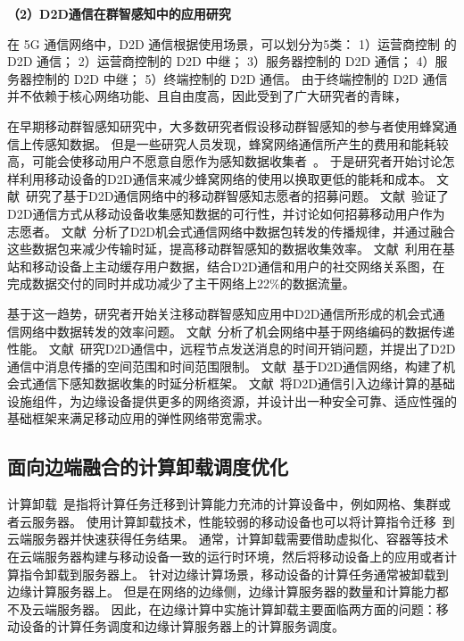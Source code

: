 \textbf{（2）D2D通信在群智感知中的应用研究}

在 5G 通信网络中，D2D 通信根据使用场景，可以划分为5类：
1）运营商控制 的 D2D 通信；%
2）运营商控制的 D2D 中继；%
3）服务器控制的 D2D 通信；%
4）服务器控制的 D2D 中继；%
5）终端控制的 D2D 通信。%
由于终端控制的 D2D 通信并不依赖于核心网络功能、且自由度高，因此受到了广大研究者的青睐，

在早期移动群智感知研究中，大多数研究者假设移动群智感知的参与者使用蜂窝通信上传感知数据。
但是一些研究人员发现，蜂窝网络通信所产生的费用和能耗较高，可能会使移动用户不愿意自愿作为感知数据收集者~\cite{DBLP:conf/globecom/ZhangJLLC16,DBLP:conf/icdcs/XiaoWHHH16}。
于是研究者开始讨论怎样利用移动设备的D2D通信来减少蜂窝网络的使用以换取更低的能耗和成本。
文献~研究了基于D2D通信网络中的移动群智感知志愿者的招募问题。
文献~验证了D2D通信方式从移动设备收集感知数据的可行性，并讨论如何招募移动用户作为志愿者。 
文献~分析了D2D机会式通信网络中数据包转发的传播规律，并通过融合这些数据包来减少传输时延，提高移动群智感知的数据收集效率。
文献~利用在基站和移动设备上主动缓存用户数据，结合D2D通信和用户的社交网络关系图，在完成数据交付的同时并成功减少了主干网络上22\%的数据流量。

基于这一趋势，研究者开始关注移动群智感知应用中D2D通信所形成的机会式通信网络中数据转发的效率问题。
文献~分析了机会网络中基于网络编码的数据传递性能。
文献~研究D2D通信中，远程节点发送消息的时间开销问题，并提出了D2D通信中消息传播的空间范围和时间范围限制。
文献~基于D2D通信网络，构建了机会式通信下感知数据收集的时延分析框架。
文献~将D2D通信引入边缘计算的基础设施组件，为边缘设备提供更多的网络资源，并设计出一种安全可靠、适应性强的基础框架来满足移动应用的弹性网络带宽需求。

\subsection{面向边端融合的计算卸载调度优化}

计算卸载~\cite{DBLP:journals/network/MaZZWP13}是指将计算任务迁移到计算能力充沛的计算设备中，例如网格、集群或者云服务器。
使用计算卸载技术，性能较弱的移动设备也可以将计算指令迁移~\cite{DBLP:journals/monet/KumarLLB13}到云端服务器并快速获得任务结果。
通常，计算卸载需要借助虚拟化、容器等技术在云端服务器构建与移动设备一致的运行时环境，然后将移动设备上的应用或者计算指令卸载到服务器上。
针对边缘计算场景，移动设备的计算任务通常被卸载到边缘计算服务器上。
但是在网络的边缘侧，边缘计算服务器的数量和计算能力都不及云端服务器。
因此，在边缘计算中实施计算卸载主要面临两方面的问题：移动设备的计算任务调度和边缘计算服务器上的计算服务调度。

